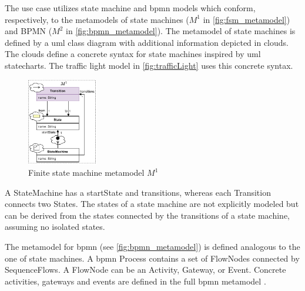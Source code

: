 \documentclass{jot}
\begin{document}
The use case utilizes state machine and \gls*{bpmn} models which conform, respectively, to the metamodels of state machines ($M^1$ in \autoref{fig:fsm_metamodel}) and BPMN ($M^2$ in \autoref{fig:bpmn_metamodel}).
The metamodel of state machines is defined by a \gls*{uml} class diagram with additional information depicted in clouds.
The clouds define a concrete syntax for state machines inspired by \gls*{uml} statecharts.
The traffic light model in \autoref{fig:trafficLight} uses this concrete syntax. 

\begin{figure}[h]
    \centering
    \includegraphics[width=0.275\textwidth]{figures/state_machine_metamodel.pdf}
    \caption{Finite state machine metamodel $M^1$}
    \label{fig:fsm_metamodel}
\end{figure}

A \textsf{StateMachine} has a \textsf{startState} and \textsf{transitions}, whereas each \textsf{Transition} connects two \textsf{State}s.
The states of a state machine are not explicitly modeled but can be derived from the states connected by the transitions of a state machine, assuming no isolated states.

The metamodel for \gls*{bpmn} (see \autoref{fig:bpmn_metamodel}) is defined analogous to the one of state machines. 
A \gls*{bpmn} \textsf{Process} contains a set of \textsf{FlowNode}s connected by \textsf{SequenceFlow}s.
A \textsf{FlowNode} can be an \textsf{Activity}, \textsf{Gateway}, or \textsf{Event}.
Concrete activities, gateways and events are defined in the full \gls*{bpmn} metamodel \cite{objectmanagementgroupBusinessProcessModel2013}. %
\end{document}
